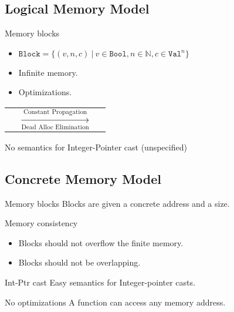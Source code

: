 \subsection{Logical Memory Model}
\begin{frame}{\subsecname}

  \begin{block}{Memory blocks}
    \begin{itemize}
    \item $\texttt{Block}=\{(v,n,c)~|~v\in\texttt{Bool},n\in\mathbb{N},c\in\texttt{Val}^{n}\}$
    \item Infinite memory.
    \item Optimizations.
    \end{itemize}
  \end{block}
  \vfill
  \begin{center}
    \begin{tabular}{l c r}
       &
      $\xrightarrow[\text{Dead Alloc Elimination}]{\text{Constant Propagation}}$ &
      
    \end{tabular}
  \end{center}
  \vfill
  \begin{alertblock}{No semantics for Integer-Pointer cast (unspecified)}
  \end{alertblock}
  
\end{frame}

\subsection{Concrete Memory Model}
\begin{frame}{\subsecname}

  \begin{block}{Memory blocks}
    Blocks are given a concrete address and a size.
  \end{block}
  \vfill
  \begin{block}{Memory consistency}
    \begin{itemize}
    \item Blocks should not overflow the finite memory.
    \item Blocks should not be overlapping.
    \end{itemize}
  \end{block}
  \vfill
  \begin{exampleblock}{Int-Ptr cast}
    Easy semantics for Integer-pointer casts.
  \end{exampleblock}
  \vfill
  \begin{alertblock}{No optimizations}
    A function can access any memory address.
  \end{alertblock}

\end{frame}

